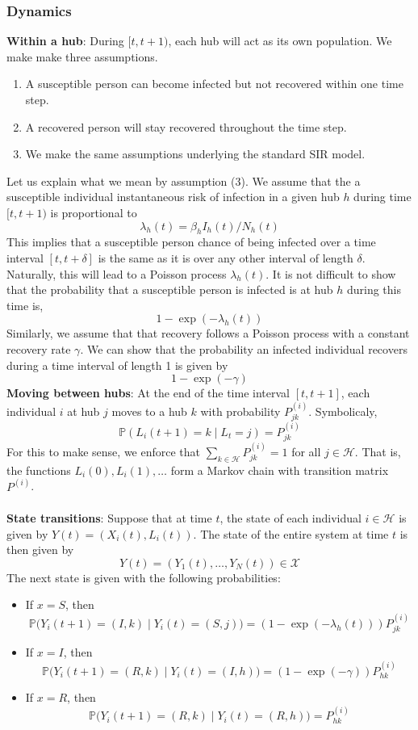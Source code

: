 \documentclass[12pt]{article}
\begin{document}
\subsubsection{Dynamics}
\textbf{Within a hub}: During $[t, t + 1)$, each hub will act as its own population. We make make three assumptions.
\begin{enumerate}
    \item A susceptible person can become infected but not recovered within one time step.
    \item A recovered person will stay recovered throughout the time step.
    \item We make the same assumptions underlying the standard SIR model.
\end{enumerate}
Let us explain what we mean by assumption (3). We assume that the a susceptible individual instantaneous risk of infection in a given hub $h$ during time $[t, t + 1)$ is proportional to
$$\lambda_{h}(t) = \beta_{h}I_{h}(t)/N_{h}(t)$$
This implies that a susceptible person chance of being infected over a time interval $[t, t + \delta]$ is the same as it is over any other interval of length $\delta$. Naturally, this will lead to a Poisson process $\lambda_{h}(t)$. It is not difficult to show that the probability that a susceptible person is infected is at hub $h$ during this time is,
$$1 - \exp(-\lambda_{h}(t))$$
Similarly, we assume that that recovery follows a Poisson process with a constant recovery rate $\gamma$. We can show that the probability an infected individual recovers during a time interval of length 1  is given by
$$1 - \exp(-\gamma)$$
\textbf{Moving between hubs}: At the end of the time interval $[t, t + 1]$, each individual $i$ at hub $j$ moves to a hub $k$ with probability $P_{jk}^{(i)}$. Symbolicaly,
$$\mathbb{P}(L_{i}(t + 1) = k \mid L_{t} = j) = P_{jk}^{(i)}$$
For this to make sense, we enforce that $\sum_{k \in \mathcal{H}}P^{(i)}_{jk} = 1$ for all $j \in \mathcal{H}$. That is, the functions $L_{i}(0), L_{i}(1), \dots$ form a Markov chain with transition matrix $P^{(i)}$.\\\\
\textbf{State transitions}: Suppose that at time $t$, the state of each individual $i \in \mathcal{H}$ is given by $Y(t) = (X_{i}(t), L_{i}(t))$. The state of the entire system at time $t$ is then given by
$$Y(t) = (Y_{1}(t), \dots, Y_{N}(t)) \in \mathcal{X}$$
The next state is given with the following probabilities:
\begin{itemize}
    \item If $x = S$, then 
    $$\mathbb{P}\bigl(Y_i(t+1) = (I,k) \mid Y_i(t) = (S,j)\bigr) = (1 - \exp(-\lambda_{h}(t)))P_{jk}^{(i)}$$
    \item If $x = I$, then 
    $$\mathbb{P}\bigl(Y_i(t+1) = (R,k) \mid Y_i(t) = (I,h)\bigr) = (1 - \exp(-\gamma)) P_{hk}^{(i)}$$
    \item If $x = R$, then 
    $$\mathbb{P}\bigl(Y_i(t+1) = (R,k) \mid Y_i(t) = (R,h)\bigr) =  P_{hk}^{(i)}$$
\end{itemize}
\end{document}

